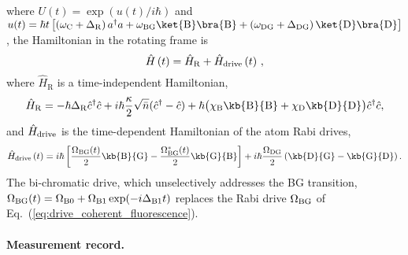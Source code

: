 where $U(t)=\exp\left(u\left(t\right)/i\hbar\right)$ and $u(t)=\hbar t\left[\left(\omega_{{\rm C}}+\Delta_{{\rm R}}\right)a^{\dagger}a+\omega_{{\rm BG}}\ket{\rm B}\bra{\rm B}+\left(\omega_{{\rm DG}}+\Delta_{{\rm DG}}\right)\ket{\rm D}\bra{\rm D}\right]$,
the Hamiltonian in the rotating frame is
\begin{equation}
\hat{H}\left(t\right)=\hat{H}_{{\rm R}}+\hat{H}_{{\rm drive}}\left(t\right)\,,
\end{equation}
where $\hat{H}_{\mathrm{R}}$ is a time-independent Hamiltonian,
\begin{equation}
\hat{H}_{{\rm R}}=-\hbar\Delta_{{\rm R}}\hat{c}^{\dagger}\hat{c}+i\hbar\frac{\kappa}{2}\sqrt{\bar{n}}(\hat{c}^{\dagger}-\hat{c})+\hbar\big(\chi_{{\rm B}}\kb{\rm B}{\rm B}+\chi_{{\rm D}}\kb{\rm D}{\rm D}\big)\hat{c}^{\dagger}\hat{c},
\end{equation}
and $\hat{H}_{{\rm drive}}$ is the time-dependent Hamiltonian of
the atom Rabi drives, 
\begin{equation}
\hat{H}_{{\rm drive}}\left(t\right)=i\hbar\left[\frac{\Omega_{{\rm BG}}(t)}{2}\kb{\rm B}{\rm G}-\frac{\Omega_{{\rm BG}}^{*}(t)}{2}\kb{\rm G}{\rm B}\right]+i\hbar\frac{\Omega_{{\rm DG}}}{2}\left(\kb{\rm D}{\rm G}-\kb{\rm G}{\rm D}\right).
\end{equation}
The bi-chromatic drive, which unselectively addresses the BG transition,
$\Omega_{{\rm BG}}(t)=\Omega_{{\rm B}0}+\Omega_{{\rm B}1}\exp(-i\Delta_{{\rm B}1}t)$
replaces the Rabi drive $\Omega_{{\rm BG}}$ of Eq.~(\ref{eq:drive_coherent_fluorescence}).

\paragraph{Measurement record.}

